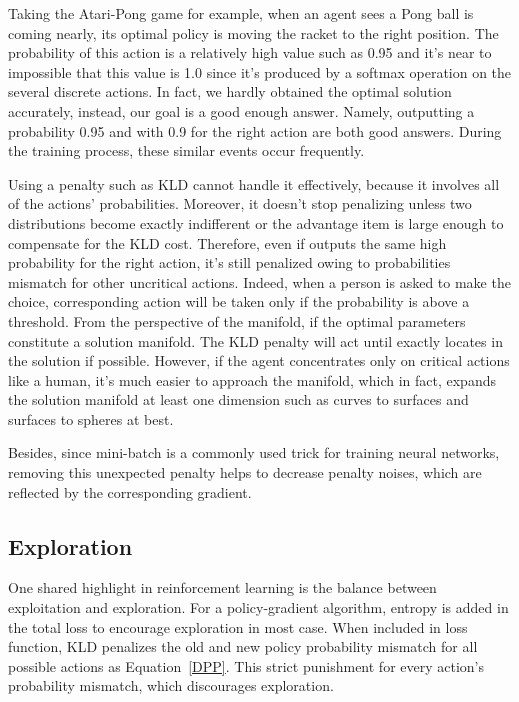 \documentclass{article}
\begin{document}
Taking the Atari-Pong game for example, when an agent sees a Pong ball is coming nearly, its optimal policy is moving the racket to  the right position. The probability of this action is a relatively high value such as 0.95 and it's near to impossible that this value is 1.0 since it's produced by a softmax operation on the several discrete actions. In fact, we hardly obtained the optimal solution accurately, instead, our goal is a good enough answer. Namely,  outputting a probability 0.95 and  with 0.9 for the right action are both good answers. During the training process, these similar events occur frequently.

Using a penalty such as KLD cannot handle it effectively, because it involves all of the actions' probabilities. Moreover, it doesn't stop penalizing unless two distributions become exactly indifferent or the advantage item is large enough to compensate for the KLD cost. Therefore, even if  outputs  the same high probability for the right action, it's still penalized owing to probabilities mismatch for other uncritical actions. Indeed, when a person is asked to make the choice, corresponding action will be taken only if the probability is above a threshold. From the perspective of the manifold, if the optimal parameters constitute a solution manifold. The KLD penalty will act until  exactly locates in the solution if possible. However, if the agent concentrates only on critical actions like a human, it's much easier to approach the manifold, which in fact, expands the solution manifold at least one dimension such as curves to surfaces and surfaces to spheres at best.



Besides, since mini-batch is a commonly used trick for training neural networks, removing this unexpected penalty helps to decrease penalty noises, which are reflected by the corresponding gradient. 

\subsection{Exploration}
One shared highlight in reinforcement learning is the balance between exploitation and exploration. For a policy-gradient  algorithm, entropy is added in the total loss to encourage exploration in most case. When included in loss function, KLD penalizes the old and new policy probability mismatch for all possible actions as Equation~\ref{DPP}. This strict punishment for every action's probability mismatch, which discourages exploration.
\end{document}
